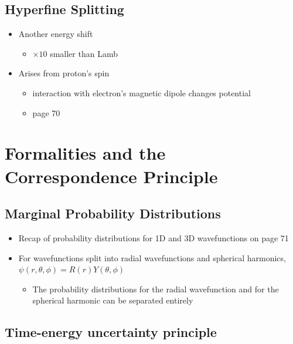 \documentclass[a4paper,11pt,normalem]{article}
\begin{document}
\subsection{Hyperfine Splitting}\label{hyperfine-splitting}

\begin{itemize}
\item
  Another energy shift
  \begin{itemize}
  \item
    \(\times 10\) smaller than Lamb
  \end{itemize}
\item
  Arises from proton's spin
  \begin{itemize}
  \item
    interaction with electron's magnetic dipole changes potential
  \item
    page 70
  \end{itemize}
\end{itemize}

\section{Formalities and the Correspondence Principle}\label{formalities-and-the-correspondence-principle}

\subsection{Marginal Probability Distributions}\label{marginal-probability-distributions}

\begin{itemize}
\item
  Recap of probability distributions for 1D and 3D wavefunctions on page
  71
\item
  For wavefunctions split into radial wavefunctions and spherical
  harmonics, \(\psi(r,\theta, \phi) = R(r)Y(\theta,\phi)\)
  \begin{itemize}
  \item
    The probability distributions for the radial wavefunction and for
    the spherical harmonic can be separated entirely
  \end{itemize}
\end{itemize}

\subsection{Time-energy uncertainty principle}\label{time-energy-uncertainty-principle}
\end{document}
